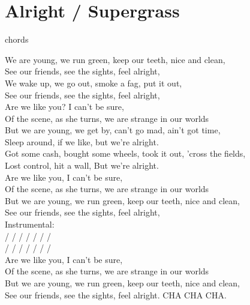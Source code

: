 \section{Alright / Supergrass}\label{sec:alright}
  {\small chords}
  
  \Eminor
  \Fsharpminor
  \Fmajor
  \Amajor
  \Gmajor
  
  We are young, we run green, keep our teeth, nice and clean,\\
  See our friends, see the sights, feel alright,\\
  We wake up, we go out, smoke a fag, put it out,\\
  See our friends, see the sights, feel alright,\\
  Are we like you? I can't be sure,\\
  Of the scene, as she turns, we are strange in our worlds\\
  But we are young, we get by, can't go mad, ain't got time,\\
  Sleep around, if we like, but we're alright.\\
  Got some cash, bought some wheels, took it out, 'cross the fields,\\
  Lost control, hit a wall, But we're alright.\\
  Are we like you, I can't be sure,\\
  Of the scene, as she turns, we are strange in our worlds\\
  But we are young, we run green, keep our teeth, nice and clean,\\
  See our friends, see the sights, feel alright,\\
  Instrumental:\\
   /  /  /  /  /  /  / \\
   /  /  /  /  /  /  / \\
  Are we like you, I can't be sure,\\
  Of the scene, as she turns, we are strange in our worlds\\
  But we are young, we run green, keep our teeth, nice and clean,\\
  See our friends, see the sights, feel alright. CHA CHA CHA.\\

